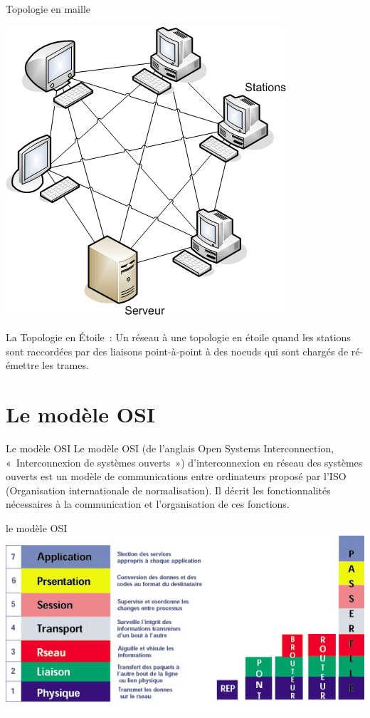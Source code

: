 \documentclass{beamer}
\begin{document}
	\begin{frame}{Topologie en maille}
		\begin{center}
			\includegraphics[scale = 0.4]{Maille.png}
		\end{center}
			La Topologie en Étoile : Un réseau à une topologie en étoile quand les stations sont raccordées par des liaisons point-à-point à des noeuds qui sont chargés de ré-émettre les trames.
	\end{frame}

\section{Le modèle OSI}

	\begin{frame}{Le modèle OSI}
		Le modèle OSI (de l'anglais Open Systems Interconnection, « Interconnexion de systèmes ouverts ») d'interconnexion en réseau des systèmes ouverts est un modèle de communications entre ordinateurs proposé par l'ISO (Organisation internationale de normalisation). Il décrit les fonctionnalités nécessaires à la communication et l'organisation de ces fonctions.
	
	\end{frame}

	\begin{frame}{le modèle OSI}
		\includegraphics[scale = 0.8]{OSI.jpg}\\
	\end{frame}
\end{document}
